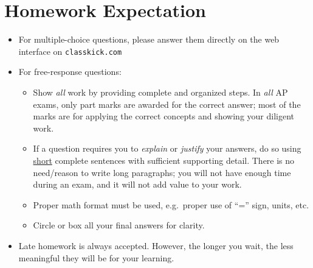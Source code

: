 \documentclass{../../oss-handout}
\begin{document}
\section{Homework Expectation}
\begin{itemize}[nosep]
\item For multiple-choice questions, please answer them directly on the web
  interface on \texttt{classkick.com} %
\item For free-response questions:
  \begin{itemize}[nosep]
  \item Show \emph{all} work by providing complete and organized steps. In
    \emph{all} AP exams, only part marks are awarded for the correct answer;
    most of the marks are for applying the correct concepts and showing your
    diligent work.
  \item If a question requires you to \emph{explain} or \emph{justify} your
    answers, do so using \underline{short} complete sentences with sufficient
    supporting detail. There is no need/reason to write long paragraphs; you
    will not have enough time during an exam, and it will not add value to
    your work.
  \item Proper math format must be used, e.g.\ proper use of ``='' sign, units,
    etc.
  \item Circle or box all your final answers for clarity.
  \end{itemize}
\item Late homework is always accepted. However, the longer you wait, the less
  meaningful they will be for your learning.
\end{itemize}

\end{document}
